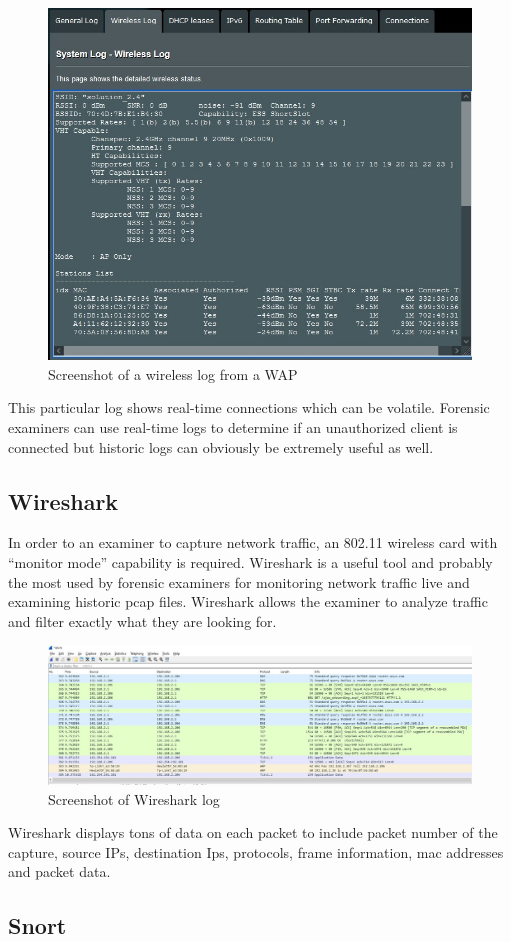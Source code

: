 \documentclass[acmlarge]{style/acmart}
\begin{document}
\begin{figure}[H]
  \centering
  \includegraphics[width=0.5\linewidth]{imgs/waplog.jpg}
  \caption{Screenshot of a wireless log from a WAP}
  \label{fig:waplog}
\end{figure}

This particular log shows real-time connections which can be volatile. Forensic examiners can use real-time logs to determine if an unauthorized client is connected but historic logs can obviously be extremely useful as well. 

\subsection{Wireshark}

In order to an examiner to capture network traffic, an 802.11 wireless card with “monitor mode” capability is required. Wireshark is a useful tool and probably the most used by forensic examiners for monitoring network traffic live and examining historic pcap files. Wireshark allows the examiner to analyze traffic and filter exactly what they are looking for. 

\begin{figure}[H]
  \centering
  \includegraphics[width=0.5\linewidth]{imgs/wireshark.jpg}
  \caption{Screenshot of Wireshark log}
  \label{fig:wireshark}
\end{figure}

Wireshark displays tons of data on each packet to include packet number of the capture, source IPs, destination Ips, protocols, frame information, mac addresses and packet data. 

\subsection{Snort}
\end{document}
